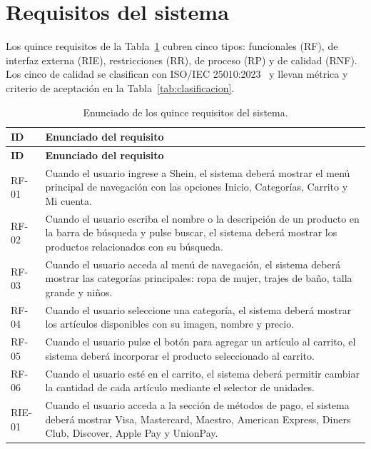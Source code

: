 \documentclass[11pt,a4paper]{article}
\begin{document}
\section{Requisitos del sistema}
\label{sec:requisitos}

Los quince requisitos de la Tabla~\ref{tab:requisitos} cubren cinco tipos:
funcionales (RF), de interfaz externa (RIE), restricciones (RR), de proceso
(RP) y de calidad (RNF). Los cinco de calidad se clasifican con
ISO/IEC 25010:2023~\cite{iso25010} y llevan métrica y criterio de
aceptación en la Tabla~\ref{tab:clasificacion}.

\begin{longtable}{>{\raggedright\arraybackslash}p{1.6cm}
                  >{\raggedright\arraybackslash}p{12.6cm}}
\caption{Enunciado de los quince requisitos del sistema.}
\label{tab:requisitos}\\
\toprule
\textbf{ID} & \textbf{Enunciado del requisito} \\
\midrule
\endfirsthead
\toprule
\textbf{ID} & \textbf{Enunciado del requisito} \\
\midrule
\endhead
\bottomrule
\endfoot
RF-01 & Cuando el usuario ingrese a Shein, el sistema deberá mostrar el
menú principal de navegación con las opciones Inicio, Categorías, Carrito
y Mi cuenta. \\
RF-02 & Cuando el usuario escriba el nombre o la descripción de un
producto en la barra de búsqueda y pulse buscar, el sistema deberá mostrar
los productos relacionados con su búsqueda. \\
RF-03 & Cuando el usuario acceda al menú de navegación, el sistema deberá
mostrar las categorías principales: ropa de mujer, trajes de baño, talla
grande y niños. \\
RF-04 & Cuando el usuario seleccione una categoría, el sistema deberá
mostrar los artículos disponibles con su imagen, nombre y precio. \\
RF-05 & Cuando el usuario pulse el botón para agregar un artículo al
carrito, el sistema deberá incorporar el producto seleccionado al carrito. \\
RF-06 & Cuando el usuario esté en el carrito, el sistema deberá permitir
cambiar la cantidad de cada artículo mediante el selector de unidades. \\
RIE-01 & Cuando el usuario acceda a la sección de métodos de pago, el
sistema deberá mostrar Visa, Mastercard, Maestro, American Express, Diners
Club, Discover, Apple Pay y UnionPay. \\

\end{longtable}
\end{document}
